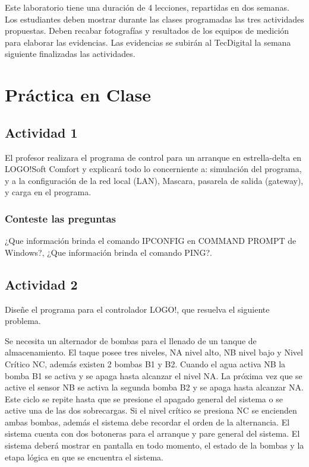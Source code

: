 Este laboratorio tiene una duración de 4 lecciones, repartidas en dos semanas. Los estudiantes deben mostrar durante las clases programadas las tres actividades propuestas. Deben recabar fotografías y resultados de los equipos de medición para elaborar las evidencias. Las evidencias se subirán al TecDigital la semana siguiente finalizadas las actividades.

\section{Práctica en Clase}

\subsection{Actividad 1}

	El profesor realizara el programa de control para un arranque en estrella-delta en LOGO!Soft Comfort y explicará todo lo concerniente a: simulación del programa, y a la configuración de la red local (LAN), Mascara, pasarela de salida (gateway), y carga en el programa. 
	
 \subsubsection{Conteste las preguntas}
 	¿Que información brinda el comando IPCONFIG en COMMAND PROMPT de Windows?, ¿Que información brinda el comando PING?.  

\subsection{Actividad 2}


Diseñe el programa para el controlador LOGO!, que resuelva el siguiente problema.

Se necesita un alternador de bombas  para el llenado de un tanque de almacenamiento. El taque posee tres niveles, NA nivel alto, NB nivel bajo y Nivel Crítico NC, además existen 2 bombas B1 y B2. Cuando el agua activa NB la bomba B1 se activa y se apaga hasta alcanzar el nivel NA. La próxima vez que se active el sensor NB se activa la segunda bomba B2 y se apaga hasta alcanzar NA. Este ciclo se repite hasta que se presione el apagado general del sistema o se active una de las dos sobrecargas. Si el nivel crítico se presiona NC se encienden ambas bombas, además el sistema debe  recordar el orden de la alternancia. El sistema cuenta con dos botoneras para el arranque y pare general del sistema. El sistema deberá mostrar en pantalla en todo momento,  el estado de la bombas y la etapa lógica en que se encuentra el sistema.


